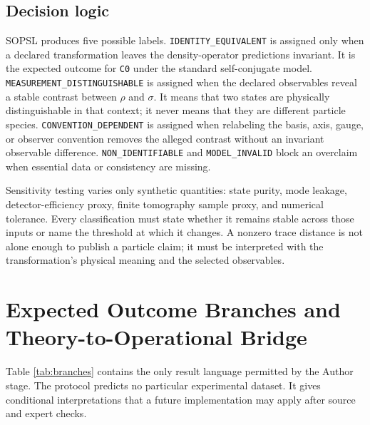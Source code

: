 \documentclass[conference]{../../../../Conference-LaTeX-template_10-17-19/IEEEtran}
\begin{document}
\subsection{Decision logic}
SOPSL produces five possible labels. \texttt{IDENTITY\_EQUIVALENT} is assigned only when a declared transformation leaves the density-operator predictions invariant. It is the expected outcome for \texttt{C0} under the standard self-conjugate model. \texttt{MEASUREMENT\_DISTINGUISHABLE} is assigned when the declared observables reveal a stable contrast between $\rho$ and $\sigma$. It means that two states are physically distinguishable in that context; it never means that they are different particle species. \texttt{CONVENTION\_DEPENDENT} is assigned when relabeling the basis, axis, gauge, or observer convention removes the alleged contrast without an invariant observable difference. \texttt{NON\_IDENTIFIABLE} and \texttt{MODEL\_INVALID} block an overclaim when essential data or consistency are missing.

Sensitivity testing varies only synthetic quantities: state purity, mode leakage, detector-efficiency proxy, finite tomography sample proxy, and numerical tolerance. Every classification must state whether it remains stable across those inputs or name the threshold at which it changes. A nonzero trace distance is not alone enough to publish a particle claim; it must be interpreted with the transformation’s physical meaning and the selected observables.

\section{Expected Outcome Branches and Theory-to-Operational Bridge}
Table \ref{tab:branches} contains the only result language permitted by the Author stage. The protocol predicts no particular experimental dataset. It gives conditional interpretations that a future implementation may apply after source and expert checks.
\end{document}
